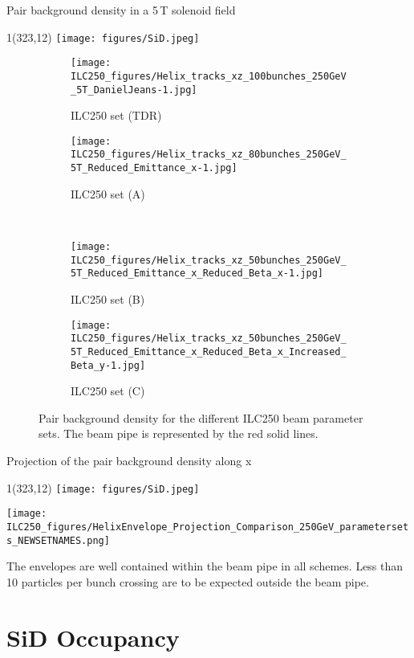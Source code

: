 \documentclass[xcolor={dvipsnames}]{beamer}
\newcommand{\sidlogo}{
  \setlength{\TPHorizModule}{1pt}
  \setlength{\TPVertModule}{1pt}
  \begin{textblock}{1}(323,12)
   \texttt{[image: figures/SiD.jpeg]}
  \end{textblock}
  }
\begin{document}
\begin{frame}{Pair background density in a 5\,T solenoid field}
\sidlogo
 \begin{figure}
\centering
\begin{subfigure}[t]{0.35\textwidth}
\centering
\texttt{[image: ILC250\_figures/Helix\_tracks\_xz\_100bunches\_250GeV\_5T\_DanielJeans-1.jpg]}
\caption{ILC250 set (TDR)}
\end{subfigure}
\hspace*{0.1cm}
\begin{subfigure}[t]{0.35\textwidth}
\centering
\texttt{[image: ILC250\_figures/Helix\_tracks\_xz\_80bunches\_250GeV\_5T\_Reduced\_Emittance\_x-1.jpg]}
\caption{ILC250 set (A)}
\end{subfigure}
\\
\begin{subfigure}[t]{0.35\textwidth}
\centering
\texttt{[image: ILC250\_figures/Helix\_tracks\_xz\_50bunches\_250GeV\_5T\_Reduced\_Emittance\_x\_Reduced\_Beta\_x-1.jpg]}
\caption{ILC250 set (B)}
\end{subfigure}
\hspace*{0.1cm}
\begin{subfigure}[t]{0.35\textwidth}
\centering
\texttt{[image: ILC250\_figures/Helix\_tracks\_xz\_50bunches\_250GeV\_5T\_Reduced\_Emittance\_x\_Reduced\_Beta\_x\_Increased\_Beta\_y-1.jpg]}
\caption{ILC250 set (C)}
\end{subfigure}
\caption{Pair background density for the different ILC250 beam parameter sets.
The beam pipe is represented by the red solid lines.}
\label{fig:Envelopes}
\end{figure}

\end{frame}

\begin{frame}{Projection of the pair background density along x}
\sidlogo
\begin{center}
 \texttt{[image: ILC250\_figures/HelixEnvelope\_Projection\_Comparison\_250GeV\_parametersets\_NEWSETNAMES.png]}
\end{center}
The envelopes are well contained within the beam pipe in all schemes. Less than 10 particles per bunch crossing are to be expected outside the beam pipe.
\end{frame}

\section{SiD Occupancy}
\end{document}
